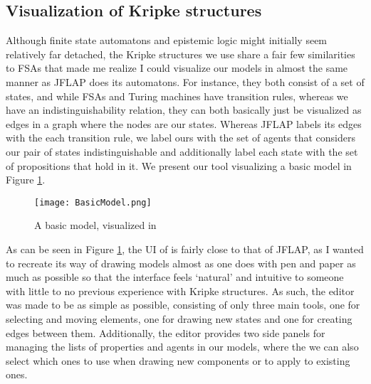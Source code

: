 \subsection{Visualization of Kripke structures}
Although finite state automatons and epistemic logic might initially seem relatively far detached, the Kripke structures we use share a fair few similarities to FSAs that made me realize I could visualize our models in almost the same manner as JFLAP does its automatons. For instance, they both consist of a set of states, and while FSAs and Turing machines have transition rules, whereas we have an indistinguishability relation, they can both basically just be visualized as edges in a graph where the nodes are our states. Whereas JFLAP labels its edges with the each transition rule, we label ours with the set of agents that considers our pair of states indistinguishable and additionally label each state with the set of propositions that hold in it. We present our tool visualizing a basic model in Figure \ref{fig:basicModelVis}.


\begin{figure}[H]
	\label{fig:basicModelVis}
	\caption{A basic model, visualized in \cname}
	\texttt{[image: BasicModel.png]}
\end{figure} 

As can be seen in Figure \ref{fig:basicModelVis}, the UI of \cname{} is fairly close to that of JFLAP, as I wanted to recreate its way of drawing models almost as one does with pen and paper as much as possible so that the interface feels `natural' and intuitive to someone with little to no previous experience with Kripke structures. As such, the editor was made to be as simple as possible, consisting of only three main tools, one for selecting and moving elements, one for drawing new states and one for creating edges between them. Additionally, the editor provides two side panels for managing the lists of properties and agents in our models, where the we can also select which ones to use when drawing new components or to apply to existing ones.

